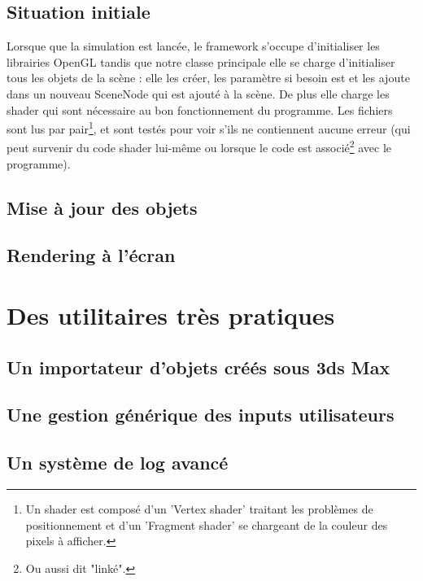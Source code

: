   \subsection{Situation initiale}
   Lorsque que la simulation est lancée, le framework s'occupe d'initialiser les librairies OpenGL tandis que notre classe principale elle se charge d'initialiser tous les objets de la scène : elle les créer, les paramètre si besoin est et les ajoute dans un nouveau SceneNode qui est ajouté à la scène. De plus elle charge les shader qui sont nécessaire au bon fonctionnement du programme. Les fichiers sont lus par pair\footnote{Un shader est composé d'un 'Vertex shader' traitant les problèmes de positionnement et d'un 'Fragment shader' se chargeant de la couleur des pixels à afficher.}, et sont testés pour voir s'ils ne contiennent aucune erreur (qui peut survenir du code shader lui-m\^{e}me ou lorsque le code est associé\footnote{Ou aussi dit "linké".} avec le programme).
  \subsection{Mise à jour des objets}
   	
  \subsection{Rendering à l'écran}
 \section{Des utilitaires très pratiques}
  \subsection{Un importateur d'objets créés sous 3ds Max}
  \subsection{Une gestion générique des inputs utilisateurs}
  \subsection{Un système de log avancé}
